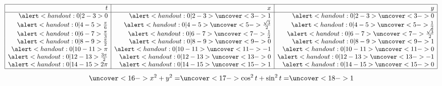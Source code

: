\begin{frame}
\begin{example}
\begin{columns}[c]
\[
\begin{array}{|r|r|r|}
\hline
t & x & y\\
\hline
\alert<handout:0| 2-3>{0} &%
\alert<handout:0| 2-3>{\uncover<3->{1}} &%
\alert<handout:0| 2-3>{\uncover<3->{0}} \\%
\alert<handout:0| 4-5>{\frac{\pi}6} &%
\alert<handout:0| 4-5>{\uncover<5->{\frac{\sqrt{3}}{2}}} &%
\alert<handout:0| 4-5>{\uncover<5->{\frac12}} \\%
\alert<handout:0| 6-7>{\frac{\pi}3} &%
\alert<handout:0| 6-7>{\uncover<7->{\frac12}} &%
\alert<handout:0| 6-7>{\uncover<7->{\frac{\sqrt{3}}2}} \\%
\alert<handout:0| 8-9>{\frac{\pi}2} &%
\alert<handout:0| 8-9>{\uncover<9->{0}} &%
\alert<handout:0| 8-9>{\uncover<9->{1}} \\%
\alert<handout:0| 10-11>{\pi} &%
\alert<handout:0| 10-11>{\uncover<11->{-1}} &%
\alert<handout:0| 10-11>{\uncover<11->{0}} \\%
\alert<handout:0| 12-13>{\frac{3\pi}2} &%
\alert<handout:0| 12-13>{\uncover<13->{0}} &%
\alert<handout:0| 12-13>{\uncover<13->{-1}} \\%
\alert<handout:0| 14-15>{2\pi} &%
\alert<handout:0| 14-15>{\uncover<15->{1}} &%
\alert<handout:0| 14-15>{\uncover<15->{0}} \\%
\hline
\end{array}
\]
\abovedisplayskip=2pt
\belowdisplayskip=2pt
\[
\uncover<16->{%
x^2 + y^2 = %
}%
\uncover<17->{%
\cos^2 t+ \sin^2 t = %
}%
\uncover<18->{%
1%
}%
\]
%
\end{columns}
\end{example}
\end{frame}
